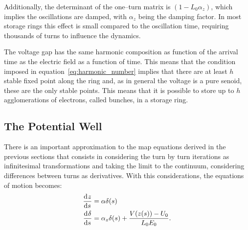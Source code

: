 	Additionally, the determinant of the one--turn matrix is $(1-L_0\alpha_z)$, which implies the oscillations are damped, with $\alpha_z$ being the damping factor. In most storage rings this effect is small compared to the oscillation time, requiring thousands of turns to influence the dynamics.

	The voltage gap has the same harmonic composition as function of the arrival time as the electric field as a function of time. This means that the condition imposed in equation~\eqref{eq:harmonic_number} implies that there are at least $h$ stable fixed point along the ring and, as in general the voltage is a pure senoid, these are the only stable points. This means that it is possible to store up to $h$ agglomerations of electrons, called bunches, in a storage ring.

\subsection{The Potential Well}\label{ssec:potential_well}

	There is an important approximation to the map equations derived in the previous sections that consists in considering the turn by turn iterations as infinitesimal transformations and taking the limit to the continuum, considering differences between turns as derivatives. With this considerations, the equations of motion becomes:
	\begin{align}
		\frac{\mathrm{d}^{{}}z}{\mathrm{d} s^{{}}} &= \alpha \delta(s) \\\nonumber
		\frac{\mathrm{d}^{{}}\delta}{\mathrm{d} s^{{}}} &= \alpha_z\delta(s) + \frac{V(z(s))-U_0}{L_0E_0}.
	\end{align}

